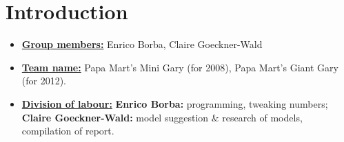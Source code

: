 \newif\ifshowsolutions
\showsolutionstrue

\newcommand{\boldline}[1]{\underline{\textbf{#1}}}



\pagestyle{fancy}






\section{Introduction}
\medskip
\begin{itemize}

    \item \boldline{Group members:} Enrico Borba, Claire Goeckner-Wald \\

    \item \boldline{Team name:} Papa Mart's Mini Gary (for 2008), Papa Mart's
    Giant Gary (for 2012). \\

    \item \boldline{Division of labour:} \textbf{Enrico Borba:} programming, tweaking numbers; \textbf{Claire Goeckner-Wald:} model suggestion $\&$ research of models,
    compilation of report.\\

\end{itemize}



